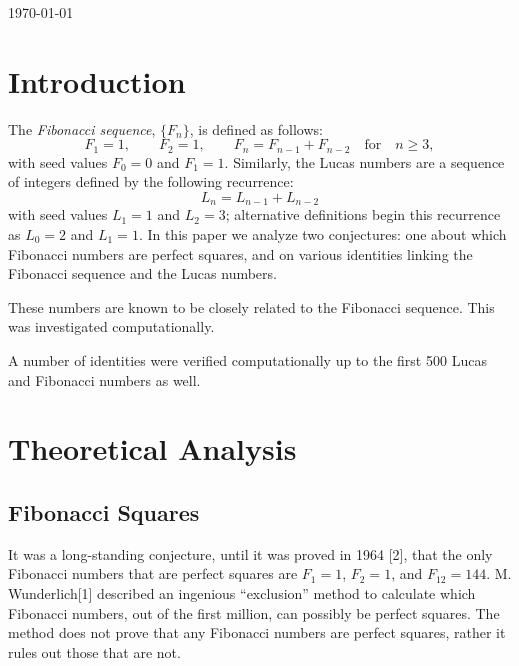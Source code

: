 \documentclass[11pt]{article}
\begin{document}
\begin{titlepage}
{\large \today}\\[3cm] 


 

\vfill 

\end{titlepage}

\tableofcontents
\newpage
\newpage
\section{Introduction}

The \textit{Fibonacci sequence}, $\{F_n\}$, is defined as follows: \[ F_1 = 1, \qquad F_2 = 1, \qquad F_n = F_{n - 1} + F_{n - 2} \quad \text{for} \quad n \geq 3, \] with seed values $F_{0} = 0$ and $F_{1} = 1$. Similarly, the Lucas numbers are a sequence of integers defined by the following recurrence: \[ L_{n} = L_{n-1} + L_{n-2}\] with seed values $L_{1} = 1$ and $L_{2} = 3$; alternative definitions begin this recurrence as $L_{0} = 2$ and $L_{1} = 1$. In this paper we analyze two conjectures: one about which Fibonacci numbers are perfect squares, and on various identities linking the Fibonacci sequence and the Lucas numbers.

These numbers are known to be closely related to the Fibonacci sequence. This was investigated computationally.

A number of identities were verified computationally up to the first 500 Lucas and Fibonacci numbers as well.


\section{Theoretical Analysis}
\subsection{Fibonacci Squares}
It was a long-standing conjecture, until it was proved in 1964 [2], that the only Fibonacci numbers that are perfect squares are $F_1 = 1$, $F_2 = 1$, and $F_{12} = 144$. M. Wunderlich[1] described an ingenious ``exclusion'' method to calculate which Fibonacci numbers, out of the first million, can possibly be perfect squares. The method does not prove that any Fibonacci numbers are perfect squares, rather it rules out those that are not.
\end{document}
